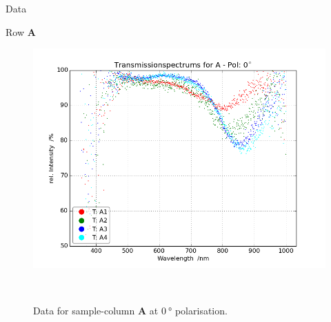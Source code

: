 \begin{appendix}
  \label{Anhang}
  
  
  
  \begin{chapter}{Data}
    \label{Appendix:Data}
    
    
    \newpage
    \begin{section}{Row \textbf{A}}
      \label{Appendix:DataA}
      
      \begin{figure}[ht!]
        \centering
        \begin{minipage}{.92\textwidth}
          \centering
          \includegraphics[width=\textwidth]{Figures/TransspecRAW_APol0.png}
          \caption{Data for sample-column \textbf{A} at $\SI{0}{\degree}$
              polarisation.}
          \label{fig:TransspecRAW_APol0}
        \end{minipage}\\
        \begin{minipage}{.92\textwidth}
          \centering

\end{minipage}
\end{figure}
\end{section}
\end{chapter}
\end{appendix}
